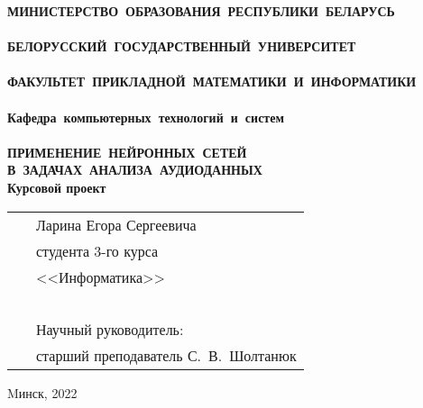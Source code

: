 \setcounter{page}{1}
\thispagestyle{empty}
\begin{center}
\bf
\vspace{4cm}
{
\mbox{МИНИСТЕРСТВО~ОБРАЗОВАНИЯ~РЕСПУБЛИКИ~БЕЛАРУСЬ} \\~\\
\mbox{БЕЛОРУССКИЙ~ГОСУДАРСТВЕННЫЙ~УНИВЕРСИТЕТ} \\~\\
\mbox{ФАКУЛЬТЕТ~ПРИКЛАДНОЙ~МАТЕМАТИКИ~И~ИНФОРМАТИКИ} \\~\\
\mbox{Кафедра~компьютерных~технологий~и~систем} \\~\\
}
\vspace{4cm}
\bf
ПРИМЕНЕНИЕ~НЕЙРОННЫХ~СЕТЕЙ\\
В~ЗАДАЧАХ~АНАЛИЗА~АУДИОДАННЫХ\\
\vspace{1cm}
\rm Курсовой проект
\vspace{3cm}
\end{center}
\begin{tabular}{ll}
\hspace{10.5cm}
&Ларина Егора Сергеевича~\\
&студента 3-го курса\\
&<<Информатика>>\\~\\
&Научный руководитель:\\
&старший преподаватель С.~В.~Шолтанюк
\end{tabular}
\vspace{4cm}
\begin{center}
Mинск, 2022
\end{center}
\clearpage
\restoregeometry